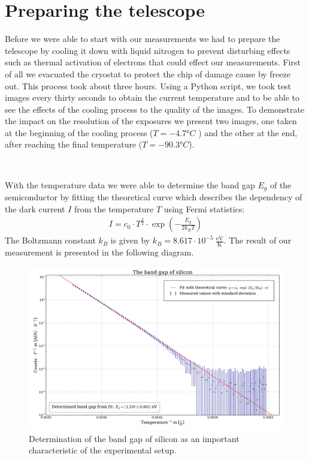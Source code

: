 \chapter{Preparing the telescope}
Before we were able to start with our measurements we had to prepare the telescope by cooling it down with liquid nitrogen to prevent disturbing effects such as thermal activation of electrons that could effect our measurements. First of all we evacuated the cryostat to protect the chip of damage cause by freeze out. This process took about three hours. Using a Python script, we took test images every thirty seconds to obtain the current temperature and to be able to see the effects of the cooling process to the quality of the images. To demonstrate the impact on the resolution of the exposures we present two images, one taken at the beginning of the cooling process ($T = -4.7 °C$ ) and the other at the end, after reaching the final temperature ($T = -90.3 °C$).
\begin{figure}[H]
	\
\end{figure}


With  the temperature data we were able to determine the band gap $E_g$ of the semiconductor by fitting the theoretical curve which describes the dependency of the dark current $I$ from the temperature $T$ using Fermi statistics:
\begin{align}
	I = c_0 \cdot T^{\frac{3}{2}}\cdot\exp(-\frac{E_g}{2 k_B T})
\end{align}
The Boltzmann constant $k_B$ is given by $k_B = 8.617 \cdot 10^{-5} \ \frac{\text{eV}}{\text{K}}$.
The result of our measurement is presented in the following diagram.
\begin{figure}[H]
\centering
\includegraphics[width=\textwidth]{figures/Plots /band_gap.pdf}
\caption{Determination of the band gap of silicon as an important characteristic of the experimental setup.}	
\end{figure}
